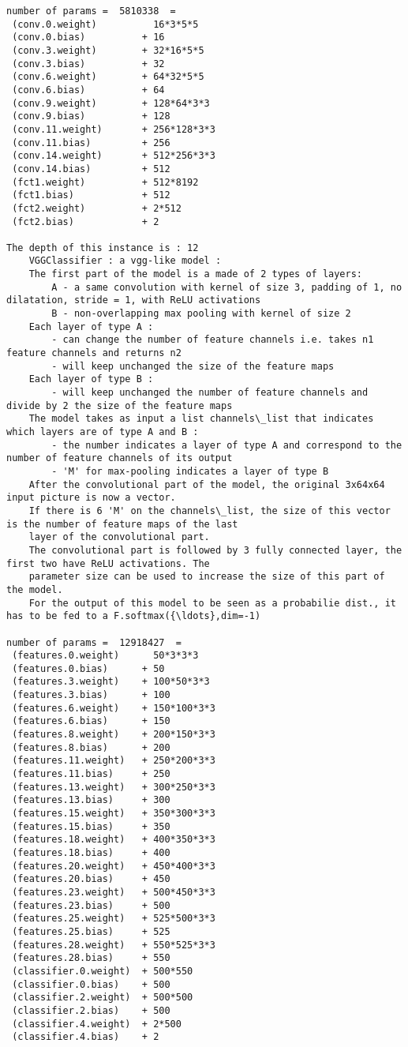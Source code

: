 \documentclass[11pt]{article}
\begin{document}
\begin{Verbatim}[commandchars=\\\{\}]
number of params =  5810338  =   
 (conv.0.weight)          16*3*5*5
 (conv.0.bias)          + 16
 (conv.3.weight)        + 32*16*5*5
 (conv.3.bias)          + 32
 (conv.6.weight)        + 64*32*5*5
 (conv.6.bias)          + 64
 (conv.9.weight)        + 128*64*3*3
 (conv.9.bias)          + 128
 (conv.11.weight)       + 256*128*3*3
 (conv.11.bias)         + 256
 (conv.14.weight)       + 512*256*3*3
 (conv.14.bias)         + 512
 (fct1.weight)          + 512*8192
 (fct1.bias)            + 512
 (fct2.weight)          + 2*512
 (fct2.bias)            + 2

The depth of this instance is : 12
    VGGClassifier : a vgg-like model :
    The first part of the model is a made of 2 types of layers:
        A - a same convolution with kernel of size 3, padding of 1, no dilatation, stride = 1, with ReLU activations
        B - non-overlapping max pooling with kernel of size 2
    Each layer of type A :
        - can change the number of feature channels i.e. takes n1 feature channels and returns n2
        - will keep unchanged the size of the feature maps
    Each layer of type B :
        - will keep unchanged the number of feature channels and divide by 2 the size of the feature maps
    The model takes as input a list channels\_list that indicates which layers are of type A and B :
        - the number indicates a layer of type A and correspond to the number of feature channels of its output
        - 'M' for max-pooling indicates a layer of type B 
    After the convolutional part of the model, the original 3x64x64 input picture is now a vector.
    If there is 6 'M' on the channels\_list, the size of this vector is the number of feature maps of the last 
    layer of the convolutional part.
    The convolutional part is followed by 3 fully connected layer, the first two have ReLU activations. The
    parameter size can be used to increase the size of this part of the model.
    For the output of this model to be seen as a probabilie dist., it has to be fed to a F.softmax({\ldots},dim=-1)
    
number of params =  12918427  =   
 (features.0.weight)      50*3*3*3
 (features.0.bias)      + 50
 (features.3.weight)    + 100*50*3*3
 (features.3.bias)      + 100
 (features.6.weight)    + 150*100*3*3
 (features.6.bias)      + 150
 (features.8.weight)    + 200*150*3*3
 (features.8.bias)      + 200
 (features.11.weight)   + 250*200*3*3
 (features.11.bias)     + 250
 (features.13.weight)   + 300*250*3*3
 (features.13.bias)     + 300
 (features.15.weight)   + 350*300*3*3
 (features.15.bias)     + 350
 (features.18.weight)   + 400*350*3*3
 (features.18.bias)     + 400
 (features.20.weight)   + 450*400*3*3
 (features.20.bias)     + 450
 (features.23.weight)   + 500*450*3*3
 (features.23.bias)     + 500
 (features.25.weight)   + 525*500*3*3
 (features.25.bias)     + 525
 (features.28.weight)   + 550*525*3*3
 (features.28.bias)     + 550
 (classifier.0.weight)  + 500*550
 (classifier.0.bias)    + 500
 (classifier.2.weight)  + 500*500
 (classifier.2.bias)    + 500
 (classifier.4.weight)  + 2*500
 (classifier.4.bias)    + 2

    \end{Verbatim}
\end{document}
